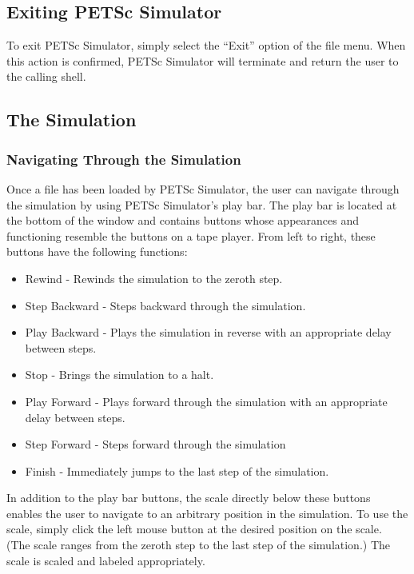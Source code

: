 \subsection{Exiting PETSc Simulator}

To exit PETSc Simulator, simply select the ``Exit'' option of the file
menu.  When this action is confirmed, PETSc Simulator will terminate
and return the user to the calling shell.

\subsection{The Simulation}

\subsubsection{Navigating Through the Simulation}

Once a file has been loaded by PETSc Simulator, the user can navigate
through the simulation by using PETSc Simulator's play bar.  The play
bar is located at the bottom of the window and contains buttons whose
appearances and functioning resemble the buttons on a tape player.
From left to right, these buttons have the following functions:
\begin{itemize}
\item Rewind - Rewinds the simulation to the zeroth step.
\item Step Backward - Steps backward through the simulation.
\item Play Backward - Plays the simulation in reverse with an appropriate delay between steps.  
\item Stop - Brings the simulation to a halt.
\item Play Forward - Plays forward through the simulation with an appropriate delay between steps.
\item Step Forward - Steps forward through the simulation
\item Finish - Immediately jumps to the last step of the simulation.
\end{itemize}

In addition to the play bar buttons, the scale directly below these
buttons enables the user to navigate to an arbitrary position in the
simulation.  To use the scale, simply click the left mouse button at
the desired position on the scale.  (The scale ranges from the zeroth
step to the last step of the simulation.)  The scale is scaled and
labeled appropriately.

